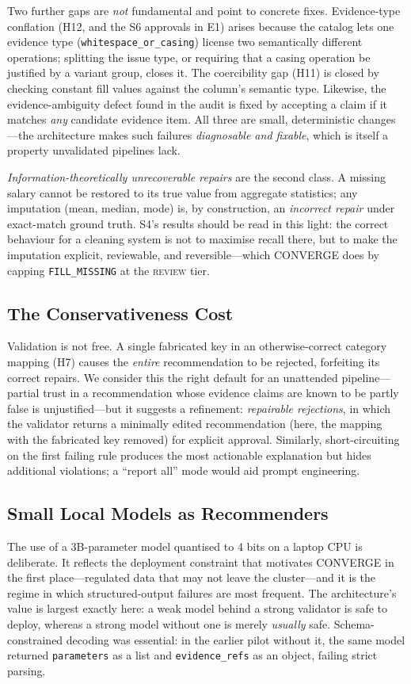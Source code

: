 Two further gaps are \emph{not} fundamental and point to concrete fixes. Evidence-type conflation (H12, and the S6 approvals in E1) arises because the catalog lets one evidence type (\texttt{whitespace\_or\_casing}) license two semantically different operations; splitting the issue type, or requiring that a casing operation be justified by a variant group, closes it. The coercibility gap (H11) is closed by checking constant fill values against the column's semantic type. Likewise, the evidence-ambiguity defect found in the audit is fixed by accepting a claim if it matches \emph{any} candidate evidence item. All three are small, deterministic changes---the architecture makes such failures \emph{diagnosable and fixable}, which is itself a property unvalidated pipelines lack.

\emph{Information-theoretically unrecoverable repairs} are the second class. A missing salary cannot be restored to its true value from aggregate statistics; any imputation (mean, median, mode) is, by construction, an \emph{incorrect repair} under exact-match ground truth. S4's results should be read in this light: the correct behaviour for a cleaning system is not to maximise recall there, but to make the imputation explicit, reviewable, and reversible---which CONVERGE does by capping \texttt{FILL\_MISSING} at the \textsc{review} tier.

\subsection{The Conservativeness Cost}
Validation is not free. A single fabricated key in an otherwise-correct category mapping (H7) causes the \emph{entire} recommendation to be rejected, forfeiting its correct repairs. We consider this the right default for an unattended pipeline---partial trust in a recommendation whose evidence claims are known to be partly false is unjustified---but it suggests a refinement: \emph{repairable rejections}, in which the validator returns a minimally edited recommendation (here, the mapping with the fabricated key removed) for explicit approval. Similarly, short-circuiting on the first failing rule produces the most actionable explanation but hides additional violations; a ``report all'' mode would aid prompt engineering.

\subsection{Small Local Models as Recommenders}
The use of a 3B-parameter model quantised to 4 bits on a laptop CPU is deliberate. It reflects the deployment constraint that motivates CONVERGE in the first place---regulated data that may not leave the cluster---and it is the regime in which structured-output failures are most frequent. The architecture's value is largest exactly here: a weak model behind a strong validator is safe to deploy, whereas a strong model without one is merely \emph{usually} safe. Schema-constrained decoding was essential: in the earlier pilot without it, the same model returned \texttt{parameters} as a list and \texttt{evidence\_refs} as an object, failing strict parsing.

